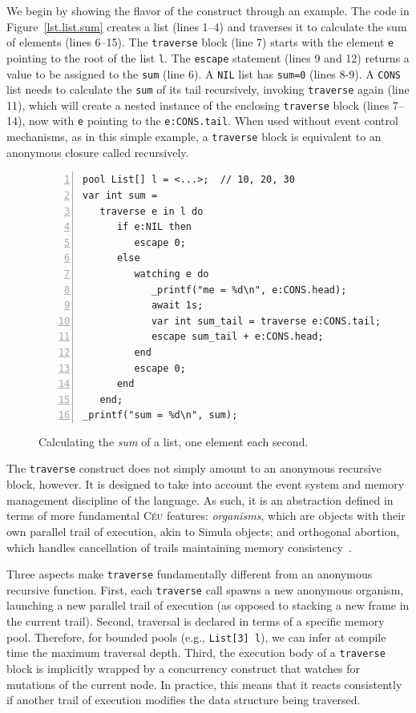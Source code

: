 \documentclass{sig-alternate}
\newcommand{\CEU}{\textsc{C\'{e}u}\xspace}
\newcommand{\code}[1] {{\small{\texttt{#1}}}}
\begin{document}
We begin by showing the flavor of the construct through an example.
The code in Figure~\ref{lst.list.sum} creates a list (lines 1--4) and traverses 
it to calculate the sum of elements (lines 6--15).
The \code{traverse} block (line 7) starts with the element \code{e} pointing to 
the root of the list \code{l}.
The \code{escape} statement (lines 9 and 12) returns a value to be assigned to 
the \code{sum} (line 6).
A \code{NIL} list has \code{sum=0} (lines 8-9).
A \code{CONS} list needs to calculate the \code{sum} of its tail recursively, 
invoking \code{traverse} again (line 11), which will create a nested instance 
of the enclosing \code{traverse} block (lines 7--14), now with \code{e} 
pointing to the \code{e:CONS.tail}.
When used without event control mechanisms, as in this simple example,
a \code{traverse} block is equivalent to an anonymous closure called recursively.

\begin{figure}%
\begin{lstlisting}[numbers=left,xleftmargin=3em]
pool List[] l = <...>;  // 10, 20, 30
var int sum =
   traverse e in l do
      if e:NIL then
         escape 0;
      else
         watching e do
            _printf("me = %d\n", e:CONS.head);
            await 1s;
            var int sum_tail = traverse e:CONS.tail;
            escape sum_tail + e:CONS.head;
         end
         escape 0;
      end
   end;
_printf("sum = %d\n", sum);
\end{lstlisting}
\caption{
Calculating the \emph{sum} of a list, one element each second.
\label{lst.list.sum.react}
}
\end{figure}

The \code{traverse} construct does not simply amount to an anonymous recursive
block, however. It is designed to take into account the event system and
memory management discipline of the language. As such, it is an abstraction
defined in terms of more fundamental \CEU features: \emph{organisms}, which
are objects with their own parallel trail of execution, akin to Simula
objects; and orthogonal abortion, which handles cancellation of trails
maintaining memory consistency~\cite{ceu.mod15}.

Three aspects make \code{traverse} fundamentally different from an anonymous
recursive function. First, each \code{traverse} call spawns a new anonymous
organism, launching a new parallel trail of execution (as opposed to stacking
a new frame in the current trail). Second, traversal is declared in terms of a
specific memory pool. Therefore, for bounded pools (e.g., \code{List[3] l}),
we can infer at compile time the maximum traversal depth. Third, the execution
body of a \code{traverse} block is implicitly wrapped by a concurrency
construct that watches for mutations of the current node. In practice, this
means that it reacts consistently if another trail of execution modifies the
data structure being traversed.
\end{document}
